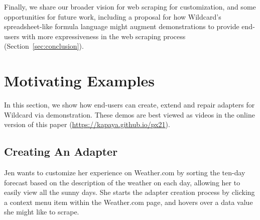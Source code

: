 \documentclass[sigconf,10pt]{acmart}
\begin{document}
Finally, we share our broader vision for web scraping for customization,
and some opportunities for future work, including a proposal for how
Wildcard's spreadsheet-like formula language might augment
demonstrations to provide end-users with more expressiveness in the web
scraping process (Section~\ref{sec:conclusion}).

\hypertarget{sec:demos}{%
\section{Motivating Examples}\label{sec:demos}}

In this section, we show how end-users can create, extend and repair
adapters for Wildcard via demonstration.{ These demos are best viewed as
videos in the online version of this paper
(\url{https://kapaya.github.io/px21}).}

\hypertarget{creating-an-adapter}{%
\subsection{Creating An Adapter}\label{creating-an-adapter}}

Jen wants to customize her experience on Weather.com by sorting the
ten-day forecast based on the description of the weather on each day,
allowing her to easily view all the sunny days. She starts the adapter
creation process by clicking a context menu item within the Weather.com
page, and hovers over a data value she might like to scrape.
\end{document}
